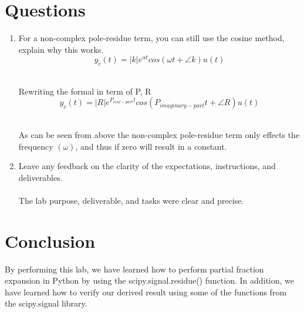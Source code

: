 \documentclass[12pt,a4paper]{article}
\begin{document}

\section{Questions}\label{sec:res}
\begin{enumerate}
    
    \item
    For a non-complex pole-residue term, you can still use the cosine method, explain why this
    works.\\
    $$y_{c}(t) = |k|e^{\alpha t}cos(\omega t + \angle k)u(t)$$
    
    \\Rewriting the formal in term of P, R\\
    
    $$y_{c}(t) = |R|e^{P_{real-part}t}cos(P_{imaginary-part}t + \angle R)u(t)$$
    
    \\As can be seen from above the non-complex pole-residue term only effects the frequency $(\omega)$, and thus if zero will result in a constant.\\
    
    \item
    Leave any feedback on the clarity of the expectations, instructions, and deliverables.\\
    \\The lab purpose, deliverable, and tasks were clear and precise.
\end{enumerate}
\section{Conclusion}\label{sec:res}
 
    By performing this lab, we have learned how to perform partial fraction expansion in Python by using the scipy.signal.residue() function. In addition, we have learned how to verify our derived result using some of the functions from the scipy.signal library. 


\end{document}

